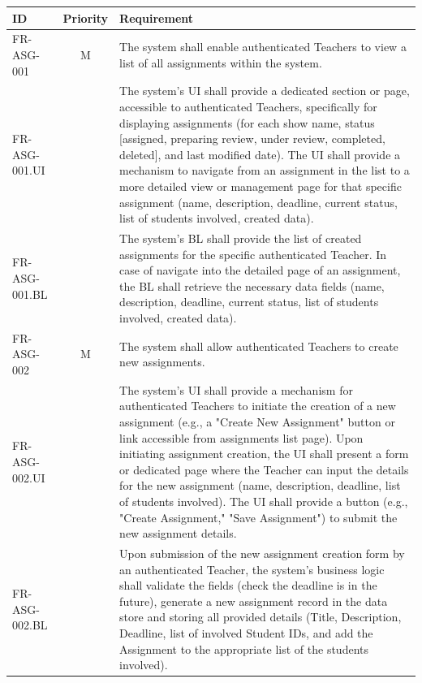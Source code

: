     \begin{tabular}{|l|c|p{10cm}|}
        \hline
        \textbf{ID} & \textbf{Priority} & \textbf{Requirement} \\
        \hline
        FR-ASG-001 & M & The system shall enable authenticated Teachers to view a list of all assignments within the system. \\
        \quad FR-ASG-001.UI &  & \quad The system's UI shall provide a dedicated section or page, accessible to authenticated Teachers, specifically for displaying assignments (for each show name, status [assigned, preparing review, under review, completed, deleted], and last modified date). The UI shall provide a mechanism to navigate from an assignment in the list to a more detailed view or management page for that specific assignment (name, description, deadline, current status, list of students involved, created data). \\
        \quad FR-ASG-001.BL &  & \quad The system’s BL shall provide the list of created assignments for the specific authenticated Teacher. In case of navigate into the detailed page of an assignment, the BL shall retrieve the necessary data fields (name, description, deadline, current status, list of students involved, created data). \\
        \hline
        FR-ASG-002 & M & The system shall allow authenticated Teachers to create new assignments. \\
        \quad FR-ASG-002.UI &  & \quad The system's UI shall provide a mechanism for authenticated Teachers to initiate the creation of a new assignment (e.g., a "Create New Assignment" button or link accessible from assignments list page). Upon initiating assignment creation, the UI shall present a form or dedicated page where the Teacher can input the details for the new assignment (name, description, deadline, list of students involved). The UI shall provide a button (e.g., "Create Assignment," "Save Assignment") to submit the new assignment details. \\
        \quad FR-ASG-002.BL &  & \quad Upon submission of the new assignment creation form by an authenticated Teacher, the system's business logic shall validate the fields (check the deadline is in the future), generate a new assignment record in the data store and storing all provided details (Title, Description, Deadline, list of involved Student IDs, and add the Assignment to the appropriate list of the students involved). \\
        \hline
    \end{tabular}

